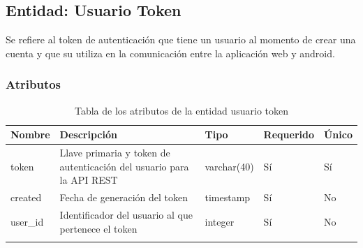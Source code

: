 \subsection{Entidad: Usuario Token}
Se refiere al token de autenticación que tiene un usuario al momento de crear una cuenta y que su utiliza en la comunicación entre la aplicación web y android.
\subsubsection{Atributos}
\begin{center}
	\begin{longtable}{|J{3cm}|J{4cm}|J{3cm}|J{2cm}|J{2cm}|}
		\hline
		\textbf{Nombre} & \textbf{Descripción} & \textbf{Tipo} & \textbf{Requerido} & \textbf{Único} \\ \hline
		token & Llave primaria y token de autenticación del usuario para la API REST & varchar(40) & Sí &  Sí\\ \hline
		created & Fecha de generación del token & timestamp & Sí & No\\ \hline
		user\_id & Identificador del usuario al que pertenece el token& integer & Sí & No\\ \hline
		\caption{Tabla de los atributos de la entidad usuario token}
		\label{tbl:entidad-usuario-token}
	\end{longtable}
\end{center}